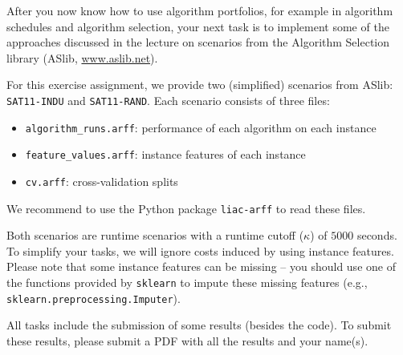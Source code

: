 \documentclass{exam}
\begin{document}
After you now know how to use algorithm portfolios, for example in algorithm schedules
and algorithm selection, your next task is to implement some of the approaches discussed in the lecture 
on scenarios from the Algorithm Selection library (ASlib, \url{www.aslib.net}).  

\bigskip

For this exercise assignment, 
we provide two (simplified) scenarios from ASlib: \texttt{SAT11-INDU} and \texttt{SAT11-RAND}.
Each scenario consists of three files:
\begin{itemize}
  \item \texttt{algorithm\_runs.arff}: performance of each algorithm on each instance
  \item \texttt{feature\_values.arff}: instance features of each instance 
  \item \texttt{cv.arff}: cross-validation splits
\end{itemize}

We recommend to use the Python package \texttt{liac-arff} to read these files.

Both scenarios are runtime scenarios with a runtime cutoff ($\kappa$) of $5000$ seconds.
To simplify your tasks, we will ignore costs induced by using instance features.
Please note that some instance features can be missing -- you should use one of the functions provided by \texttt{sklearn} to impute these missing features (e.g., \texttt{sklearn.preprocessing.Imputer}).

\bigskip

All tasks include the submission of some results (besides the code).
To submit these results, please submit a PDF with all the results and your name(s).
\end{document}
